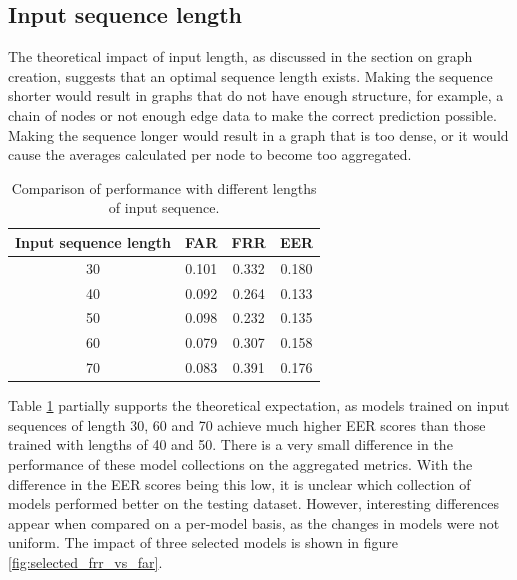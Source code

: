 \subsection{Input sequence length}
The theoretical impact of input length, as discussed in the section on graph creation, suggests that an optimal sequence length exists. Making the sequence shorter would result in graphs that do not have enough structure, for example, a chain of nodes or not enough edge data to make the correct prediction possible. Making the sequence longer would result in a graph that is too dense, or it would cause the averages calculated per node to become too aggregated.


\begin{center}
	\begin{table}[H]
		\begin{center}
			\begin{tabular}{ |c|c|c|c| } 
				\hline
				Input sequence length & FAR & FRR & EER \\
				\hline
				30 & 0.101 & 0.332 & 0.180 \\
				\hline
				40 & 0.092 & 0.264 & 0.133 \\
				\hline
				50 & 0.098 & 0.232 & 0.135 \\
				\hline
				60 & 0.079 & 0.307 & 0.158 \\
				\hline
				70 & 0.083 & 0.391 & 0.176 \\
				\hline
			\end{tabular}
		\end{center}
		\caption{Comparison of performance with different lengths of input sequence.}
		\label{table:len_vs_perf}
	\end{table}
\end{center}


Table \ref{table:len_vs_perf} partially supports the theoretical expectation, as models trained on input sequences of length 30, 60 and 70 achieve much higher EER scores than those trained with lengths of 40 and 50. There is a very small difference in the performance of these model collections on the aggregated metrics. 
With the difference in the EER scores being this low, it is unclear which collection of models performed better on the testing dataset.
However, interesting differences appear when compared on a per-model basis, as the changes in models were not uniform. The impact of three selected models is shown in figure \ref{fig:selected_frr_vs_far}. 

